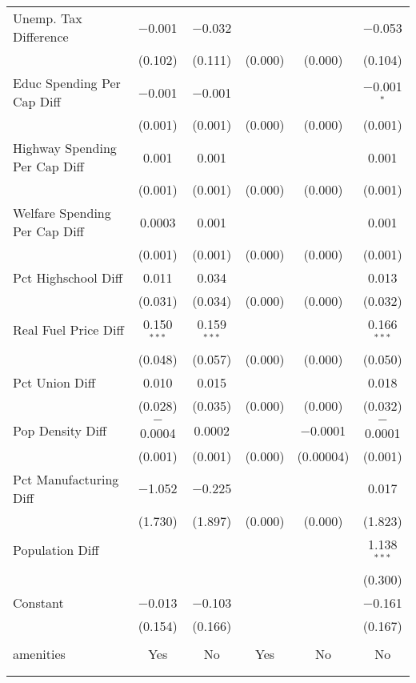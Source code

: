 \begin{table}[!htbp]
\begin{tabular}{@{\extracolsep{5pt}}lccccc}
  Unemp. Tax Difference & $-$0.001 & $-$0.032 &  &  & $-$0.053 \\ 
  & (0.102) & (0.111) & (0.000) & (0.000) & (0.104) \\ 
  Educ Spending Per Cap Diff & $-$0.001 & $-$0.001 &  &  & $-$0.001$^{*}$ \\ 
  & (0.001) & (0.001) & (0.000) & (0.000) & (0.001) \\ 
  Highway Spending Per Cap Diff & 0.001 & 0.001 &  &  & 0.001 \\ 
  & (0.001) & (0.001) & (0.000) & (0.000) & (0.001) \\ 
  Welfare Spending Per Cap Diff & 0.0003 & 0.001 &  &  & 0.001 \\ 
  & (0.001) & (0.001) & (0.000) & (0.000) & (0.001) \\ 
  Pct Highschool Diff & 0.011 & 0.034 &  &  & 0.013 \\ 
  & (0.031) & (0.034) & (0.000) & (0.000) & (0.032) \\ 
  Real Fuel Price Diff & 0.150$^{***}$ & 0.159$^{***}$ &  &  & 0.166$^{***}$ \\ 
  & (0.048) & (0.057) & (0.000) & (0.000) & (0.050) \\ 
  Pct Union Diff & 0.010 & 0.015 &  &  & 0.018 \\ 
  & (0.028) & (0.035) & (0.000) & (0.000) & (0.032) \\ 
  Pop Density Diff & $-$0.0004 & 0.0002 &  & $-$0.0001 & $-$0.0001 \\ 
  & (0.001) & (0.001) & (0.000) & (0.00004) & (0.001) \\ 
  Pct Manufacturing Diff & $-$1.052 & $-$0.225 &  &  & 0.017 \\ 
  & (1.730) & (1.897) & (0.000) & (0.000) & (1.823) \\ 
  Population Diff &  &  &  &  & 1.138$^{***}$ \\ 
  &  &  &  &  & (0.300) \\ 
  Constant & $-$0.013 & $-$0.103 &  &  & $-$0.161 \\ 
  & (0.154) & (0.166) &  &  & (0.167) \\ 
 \hline \\[-1.8ex] 
amenities & Yes & No & Yes & No & No \\ 
\hline \\[-1.8ex] 
\hline 
\hline \\[-1.8ex] 
\end{tabular} 
\end{table} 
